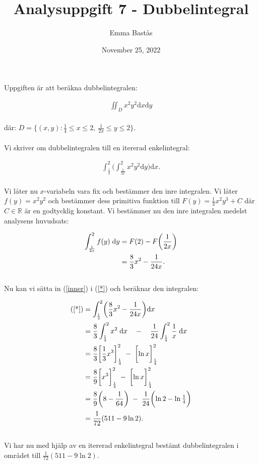 \documentclass{article}
\title{Analysuppgift 7 - Dubbelintegral}
\author{Emma Bastås}
\date{November 25, 2022}
\begin{document}
\maketitle

\noindent Uppgiften är att beräkna dubbelintegralen:

\begin{gather*}
  \iint_{D}x^{2}y^{2} \mathrm{d}x\mathrm{d}y
\end{gather*}
\\
där: $D = \{(x,y): \frac{1}{4} \leq x \leq 2,\: \frac{1}{2x} \leq y \leq 2\}$.
\\
\\
Vi skriver om dubbelintegralen till en itererad enkelintegral:

\begin{gather*}
  \int_{\frac{1}{4}}^{2}\biggl(\int_{\frac{1}{2x}}^{2} x^{2}y^{2} \mathrm{d}y\biggr) \mathrm{d}x\text{.} \tag{$\star$}\label{*}
\end{gather*}
\\
Vi låter nu $x$-variabeln vara fix och bestämmer den inre integralen. Vi låter $f(y) = x^{2}y^{2}$ och bestämmer dess primitiva funktion till $F(y) = \frac{1}{3}x^{2}y^{3} + C$ där $C \in \mathbb{R}$ är en godtycklig konstant. Vi bestämmer nu den inre integralen medelst analysens huvudsats:

\begin{align}
  \int_{\frac{1}{2x}}^{2} f(y) \;\mathrm{d}y &= F(2) - F\biggl(\frac{1}{2x}\biggr) \notag \\
  &= \frac{8}{3}x^{2} - \frac{1}{24x}\text{.} \label{inner}
\end{align}
\\
Nu kan vi sätta in (\ref{inner}) i (\ref{*}) och beräknar den integralen:

\begin{align*}
  \text{(\ref{*})} &= \int_{\frac{1}{4}}^{2} \biggl( \frac{8}{3}x^{2} - \frac{1}{24x} \biggr) \mathrm{d}x \\
                   &= \frac{8}{3} \int_{\frac{1}{4}}^{2} x^{2} \;\mathrm{d}x \quad - \quad \frac{1}{24} \int_{\frac{1}{4}}^{2}\frac{1}{x } \;\mathrm{d}x \\
                   &= \frac{8}{3} \biggl[ \frac{1}{3}x^{3} \biggr]_{\frac{1}{4}}^{2} \; - \; \biggl[ \ln x \biggr]_{\frac{1}{4}}^{2} \\
                   &= \frac{8}{9} \biggl[ x^{3} \biggr]_{\frac{1}{4}}^{2} \; - \; \biggl[ \ln x \biggr]_{\frac{1}{4}}^{2} \\
                   &= \frac{8}{9} \biggl( 8 - \frac{1}{64} \biggr) \; - \; \frac{1}{24} \biggl( \ln 2 - \ln \tfrac{1}{4} \biggr) \\[1.4pt]
                   &= \frac{1}{72}(511 - 9\ln2)\text{.}
\end{align*}
\\
Vi har nu med hjälp av en itererad enkelintegral bestämt dubbelintegralen i området till $\frac{1}{72}(511 - 9\ln2)$.
\end{document}
